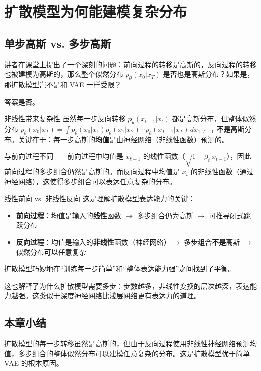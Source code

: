 \section{扩散模型为何能建模复杂分布}

\subsection{单步高斯 vs. 多步高斯}

讲者在课堂上提出了一个深刻的问题：前向过程的转移是高斯的，反向过程的转移也被建模为高斯的，那么整个似然分布 $p_\theta(x_0|x_T)$ 是否也是高斯分布？如果是，那扩散模型岂不是和 VAE 一样受限？

答案是\textbf{否}。

\begin{importantbox}{非线性带来复杂性}
虽然每一步反向转移 $p_\theta(x_{t-1}|x_t)$ 都是高斯分布，但整体似然分布 $p_\theta(x_0|x_T) = \int p_\theta(x_0|x_1) p_\theta(x_1|x_2) \cdots p_\theta(x_{T-1}|x_T) \, dx_{1:T-1}$ \textbf{不是}高斯分布。关键在于：每一步高斯的\textbf{均值}是由神经网络（非线性函数）预测的。

与前向过程不同——前向过程中均值是 $x_{t-1}$ 的线性函数（$\sqrt{1-\beta_t}\, x_{t-1}$），因此前向过程的多步组合仍然是高斯的。而反向过程中均值是 $x_t$ 的非线性函数（通过神经网络），这使得多步组合可以表达任意复杂的分布。
\end{importantbox}

\begin{warningbox}{线性前向 vs. 非线性反向}
这是理解扩散模型表达能力的关键：
\begin{itemize}
    \item \textbf{前向过程}：均值是输入的\textbf{线性}函数 $\rightarrow$ 多步组合仍为高斯 $\rightarrow$ 可推导闭式跳跃分布
    \item \textbf{反向过程}：均值是输入的\textbf{非线性}函数（神经网络）$\rightarrow$ 多步组合\textbf{不是}高斯 $\rightarrow$ 似然分布可以任意复杂
\end{itemize}
扩散模型巧妙地在``训练每一步简单''和``整体表达能力强''之间找到了平衡。
\end{warningbox}

这也解释了为什么扩散模型需要多步：步数越多，非线性变换的层次越深，表达能力越强。这类似于深度神经网络比浅层网络更有表达力的道理。

\subsection{本章小结}

扩散模型的每一步转移虽然是高斯的，但由于反向过程使用非线性神经网络预测均值，多步组合的整体似然分布可以建模任意复杂的分布。这是扩散模型优于简单 VAE 的根本原因。


